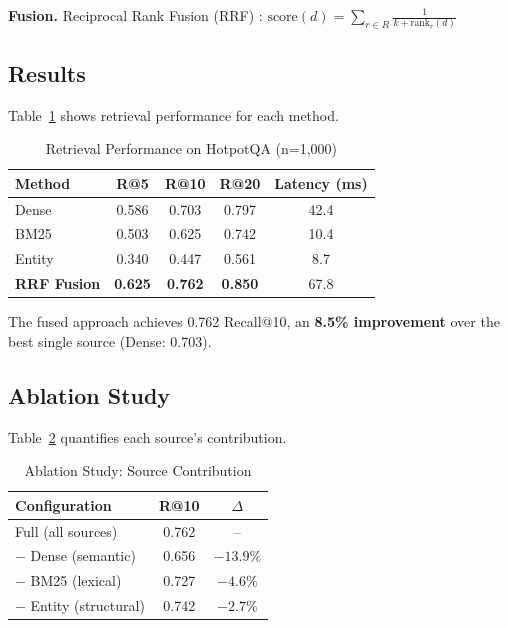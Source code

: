 \documentclass[11pt,a4paper]{article}
\begin{document}
\textbf{Fusion.} Reciprocal Rank Fusion (RRF) \citep{cormack2009rrf}: $\text{score}(d) = \sum_{r \in R} \frac{1}{k + \text{rank}_r(d)}$

\subsection{Results}

Table~\ref{tab:main_results} shows retrieval performance for each method.

\begin{table}[h]
\centering
\caption{Retrieval Performance on HotpotQA (n=1,000)}
\label{tab:main_results}
\begin{tabular}{lcccc}
\toprule
\textbf{Method} & \textbf{R@5} & \textbf{R@10} & \textbf{R@20} & \textbf{Latency (ms)} \\
\midrule
Dense & 0.586 & 0.703 & 0.797 & 42.4 \\
BM25 & 0.503 & 0.625 & 0.742 & 10.4 \\
Entity & 0.340 & 0.447 & 0.561 & 8.7 \\
\midrule
\textbf{RRF Fusion} & \textbf{0.625} & \textbf{0.762} & \textbf{0.850} & 67.8 \\
\bottomrule
\end{tabular}
\end{table}

The fused approach achieves 0.762 Recall@10, an \textbf{8.5\% improvement} over the best single source (Dense: 0.703).

\subsection{Ablation Study}

Table~\ref{tab:ablation} quantifies each source's contribution.

\begin{table}[h]
\centering
\caption{Ablation Study: Source Contribution}
\label{tab:ablation}
\begin{tabular}{lcc}
\toprule
\textbf{Configuration} & \textbf{R@10} & \textbf{$\Delta$} \\
\midrule
Full (all sources) & 0.762 & -- \\
$-$ Dense (semantic) & 0.656 & $-13.9\%$ \\
$-$ BM25 (lexical) & 0.727 & $-4.6\%$ \\
$-$ Entity (structural) & 0.742 & $-2.7\%$ \\
\bottomrule
\end{tabular}
\end{table}
\end{document}
